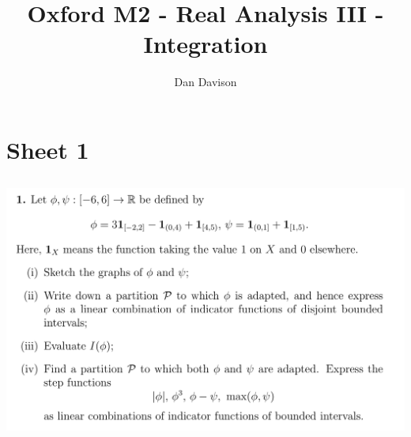 \documentclass[12pt]{article}
\title{Oxford M2 - Real Analysis III - Integration
  \footnotetext{\url{https://courses.maths.ox.ac.uk/node/37506}}} \author{Dan Davison}
\author{}
\date{}
\begin{document}
\maketitle

\section{Sheet 1}

\subsection{}
\begin{mdframed}
\includegraphics[width=400pt]{img/oxford-M2-analysis-III-1-1.png}
\end{mdframed}
\end{document}
